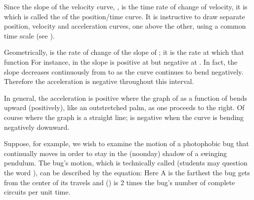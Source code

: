 {

Since the slope of the velocity curve, , is the time rate of change of
velocity, it is  which is called the  of the
position/time curve.
It is instructive to draw separate position, velocity and acceleration
curves, one above the other, using a common time scale (see ).

Geometrically,  is the rate of change of the slope of ; it is the
rate at which that function 
For instance, in  the slope is positive at  but negative at
.
In fact, the slope decreases continuously from  to 
as the curve continues to bend negatively.
Therefore the acceleration is negative throughout this interval.

In general, the acceleration  is positive where the graph of  as a
function of  bends upward (positively), like an outstretched palm, as one
proceeds to the right.
Of course  where the graph is a straight line;  is negative when the
curve is bending negatively downward.

Suppose, for example, we wish to examine the motion of a photophobic bug that
continually moves in order to stay in the (noonday) shadow of a swinging
pendulum.
The bug's motion, which is technically called 
(students may question the word ), can be described by the equation:
%
%
Here A is the farthest the bug gets from the center of its 
travels and \m{\omega} () is 2\m{\pi} times the bug's number of complete
circuits per unit time.

}
